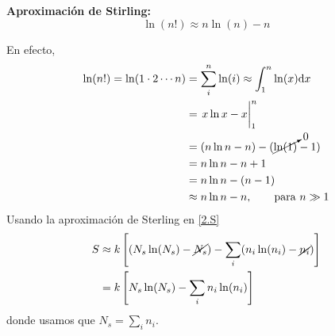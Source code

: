 \textbf{Aproximación de Stirling:}
\begin{equation}
  \boxed{\ln(n!)\approx n\ln(n)-n}
\end{equation}

En efecto,
\begin{align}
  \ln(n!)=\ln(1\cdot 2\cdots n)&=\sum_i^n\ln(i)\approx\int_1^n\ln(x)\dd x\\
  &=\eval{x\ln x-x}_1^n\\
  &=(n\ln n-n)-(\cancelto{0}{\ln(1)}-1)\\
  &=n\ln n-n+1\\
  &=n\ln n-(n-1)\\
  &\approx n\ln n-n,\qquad \text{para $n\gg 1$}
\end{align}
Usando la aproximación de Sterling en \eqref{2.S}
\begin{align}
  S&\approx k\left[(N_s\ln(N_s)-\cancel{N_s})-\sum_i (n_i\ln(n_i)-\cancel{n_i})\right]\\
  &=k\left[N_s\ln(N_s)-\sum_in_i\ln(n_i)\right]
\end{align}
donde usamos que $N_s=\sum_i n_i$.

